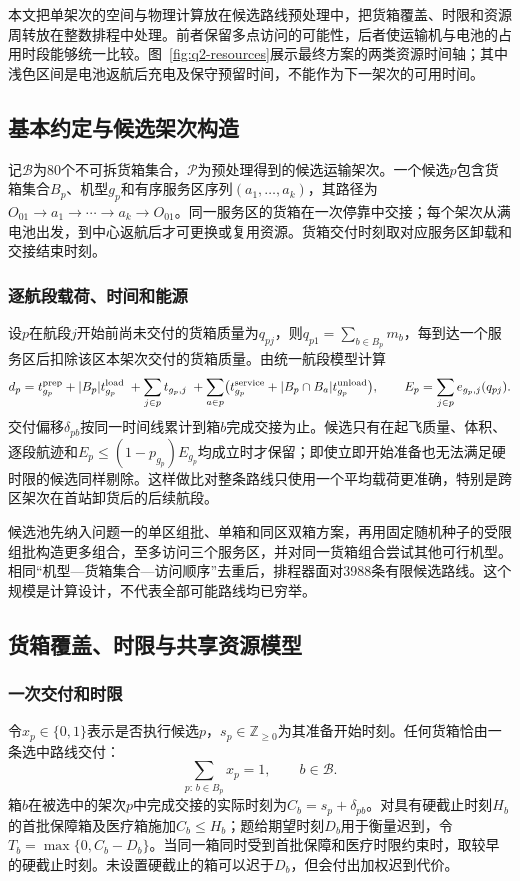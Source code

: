 \documentclass[bwprint,fontset=fandol]{gmcmthesis}
\begin{document}
本文把单架次的空间与物理计算放在候选路线预处理中，把货箱覆盖、时限和资源周转放在整数排程中处理。前者保留多点访问的可能性，后者使运输机与电池的占用时段能够统一比较。图~\ref{fig:q2-resources}展示最终方案的两类资源时间轴；其中浅色区间是电池返航后充电及保守预留时间，不能作为下一架次的可用时间。

\subsection{基本约定与候选架次构造}
记$\mathcal B$为80个不可拆货箱集合，$\mathcal P$为预处理得到的候选运输架次。一个候选$p$包含货箱集合$B_p$、机型$g_p$和有序服务区序列$(a_1,\ldots,a_k)$，其路径为$O_{01}\to a_1\to\cdots\to a_k\to O_{01}$。同一服务区的货箱在一次停靠中交接；每个架次从满电池出发，到中心返航后才可更换或复用资源。货箱交付时刻取对应服务区卸载和交接结束时刻。

\subsubsection{逐航段载荷、时间和能源}
设$p$在航段$j$开始前尚未交付的货箱质量为$q_{pj}$，则$q_{p1}=\sum_{b\in B_p}m_b$，每到达一个服务区后扣除该区本架次交付的货箱质量。由统一航段模型计算
\begin{equation}
d_p=t^{\rm prep}_{g_p}+|B_p|t^{\rm load}_{g_p}
 \;+\sum_{j\in p}t_{g_p,j}
 \;+\sum_{a\in p}\bigl(t^{\rm service}_{g_p}+|B_p\cap B_a|t^{\rm unload}_{g_p}\bigr),
\qquad E_p=\sum_{j\in p}e_{g_p,j}(q_{pj}).
\label{eq:q2-route-physics}
\end{equation}
交付偏移$\delta_{pb}$按同一时间线累计到箱$b$完成交接为止。候选只有在起飞质量、体积、逐段航迹和$E_p\le(1-p_{g_p})E_{g_p}$均成立时才保留；即使立即开始准备也无法满足硬时限的候选同样剔除。这样做比对整条路线只使用一个平均载荷更准确，特别是跨区架次在首站卸货后的后续航段。

候选池先纳入问题一的单区组批、单箱和同区双箱方案，再用固定随机种子的受限组批构造更多组合，至多访问三个服务区，并对同一货箱组合尝试其他可行机型。相同“机型—货箱集合—访问顺序”去重后，排程器面对3988条有限候选路线。这个规模是计算设计，不代表全部可能路线均已穷举。

\subsection{货箱覆盖、时限与共享资源模型}
\subsubsection{一次交付和时限}
令$x_p\in\{0,1\}$表示是否执行候选$p$，$s_p\in\mathbb Z_{\geq0}$为其准备开始时刻。任何货箱恰由一条选中路线交付：
\begin{equation}
\sum_{p:\,b\in B_p}x_p=1,\qquad b\in\mathcal B.
\label{eq:q2-cover}
\end{equation}
箱$b$在被选中的架次$p$中完成交接的实际时刻为$C_b=s_p+\delta_{pb}$。对具有硬截止时刻$H_b$的首批保障箱及医疗箱施加$C_b\le H_b$；题给期望时刻$D_b$用于衡量迟到，令$T_b=\max\{0,C_b-D_b\}$。当同一箱同时受到首批保障和医疗时限约束时，取较早的硬截止时刻。未设置硬截止的箱可以迟于$D_b$，但会付出加权迟到代价。
\end{document}
